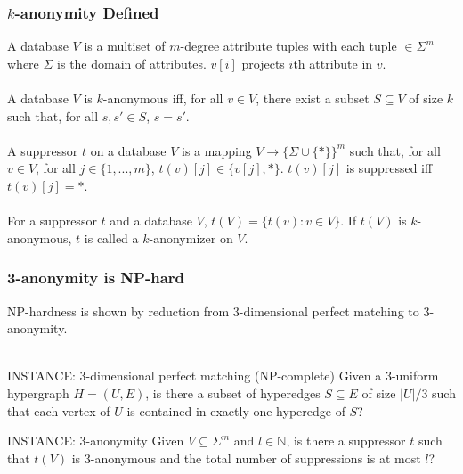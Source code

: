 \documentclass{beamer}
\begin{document}
\begin{frame}
\frametitle{$k$-anonymity Defined}
A database $V$ is a multiset of $m$-degree attribute tuples with each tuple $\in \Sigma^{m}$ where $\Sigma$ is the domain of attributes. $v[i]$ projects $i$th attribute in $v$.\\~\\

A database $V$ is $k$-anonymous iff, for all $v \in V$, there exist a subset $S \subseteq V$ of size $k$ such that, for all $s,s' \in S$, $s=s'$.\\~\\

A suppressor $t$ on a database $V$ is a mapping $V \rightarrow \{\Sigma \cup \{*\}\}^{m}$ such that, for all $v \in V$, for all $j \in \{1,...,m\}$, $t(v)[j] \in \{v[j], *\}$. $t(v)[j]$ is suppressed iff $t(v)[j] = *$.\\~\\

For a suppressor $t$ and a database $V$, $t(V) = \{t(v) : v \in V\}$. If $t(V)$ is $k$-anonymous, $t$ is called a $k$-anonymizer on $V$.
\end{frame}

\begin{frame}
\frametitle{3-anonymity is NP-hard}
NP-hardness is shown by reduction from 3-dimensional perfect matching to 3-anonymity.\\~\\

\begin{block}{INSTANCE: 3-dimensional perfect matching (NP-complete)}
Given a 3-uniform hypergraph $H = (U, E)$, is there a subset of hyperedges $S \subseteq E$ of size $|U|/3$ such that each vertex of $U$ is contained in exactly one hyperedge of $S$?
\end{block}

\begin{block}{INSTANCE: 3-anonymity}
Given $V \subseteq \Sigma^{m}$ and $l \in \mathbb{N}$, is there a suppressor $t$ such that $t(V)$ is 3-anonymous and the total number of suppressions is at most $l$?
\end{block}
\end{frame}
\end{document}
